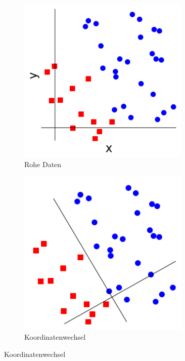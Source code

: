 \begin{figure}[hbt]
	\centering
	\begin{subfigure}{0.3\textwidth}
		\includegraphics[width=0.9\textwidth]{assets/repr_0.png}
		\caption{Rohe Daten}
	\end{subfigure}
	\begin{subfigure}{0.3\textwidth}
		\includegraphics[width=0.9\textwidth]{assets/repr_1.png}
		\caption{Koordinatenwechsel}

\end{subfigure}
\end{figure}

